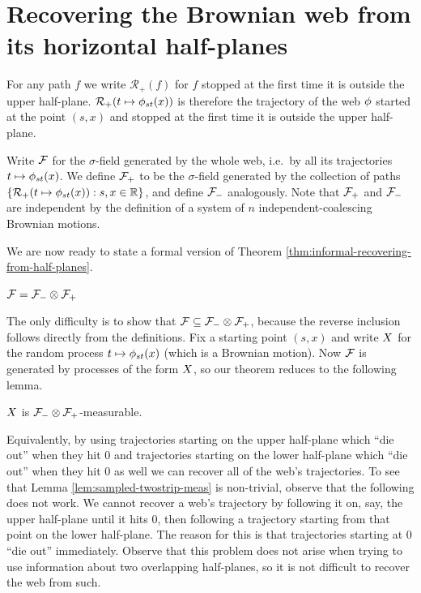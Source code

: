 \newcommand{\bmweb}{\psi}
\newcommand{\toinP}{\overset{\P}\to}
\newcommand{\statementoflemresampledetosampled}{$\resamplede \toinP \sampled$ as $\epsilon \to 0$}
{
\section{Recovering the Brownian web from its horizontal half-planes}
\label{sec:recovering-from-half-planes}


\newcommand{\restrictupper}{\mathcal{R}_{+}}

  For any path $f$ we write $\restrictupper(f)$ for $f$ stopped at the
  first time it is outside the upper half-plane.
  $\restrictupper(t \mapsto \web{s}{t}{x})$ is therefore the trajectory of the
  web $\phi$ started at the point $(s,x)$ and stopped at the first
  time it is outside the upper half-plane.

  Write $\mathcal{F}$ for the $\sigma$-field generated by the
  whole web, i.e.\ by all its trajectories $t \mapsto \phi_{{s}{t}}(x)$.
  We define $\mathcal{F}_{+}$ to be the $\sigma$-field generated by the
  collection of paths $\{\restrictupper(t \mapsto \web{s}{t}{x}) : s,x
  \in \R \}$, and define $\mathcal{F}_{-}$ analogously.
  Note that $\mathcal{F}_{+}$ and $\mathcal{F}_{-}$ are independent by the definition of
  a system of $n$ independent-coalescing Brownian motions.

  We are now ready to state a formal version of Theorem
  \ref{thm:informal-recovering-from-half-planes}.

\begin{theorem}\label{thm:recoveringfromhalfplanes}
  $\mathcal{F} = \mathcal{F}_{-} \otimes \mathcal{F}_{+}$
\end{theorem}

The only difficulty is to show that $\mathcal{F} \subseteq \mathcal{F}_{-} \otimes \mathcal{F}_{+}$,
because the reverse inclusion follows directly from the definitions.
Fix a starting point $(s,x)$ and write $X$ for the random
process $t \mapsto \phi_{{s}{t}}(x)$ (which is a Brownian motion).  Now
$\mathcal{F}$ is generated by processes of the form $X$, so
our theorem reduces to the following lemma.

\begin{lemma}
  \label{lem:sampled-twostrip-meas}
  $X$ is $\mathcal{F}_{-} \otimes \mathcal{F}_{+}$-measurable.
\end{lemma}

Equivalently, by using trajectories starting on the upper half-plane
which ``die out'' when they hit $0$ and trajectories starting on
the lower half-plane which ``die out'' when they hit $0$ as well we
can recover all of the web's trajectories.
To see that Lemma \ref{lem:sampled-twostrip-meas} is non-trivial,
observe that the following does not work. We cannot recover a web's
trajectory by following it on, say, the upper half-plane until it
hits 0, then following a trajectory starting from that point on the
lower half-plane. The reason for this is that trajectories starting at
0 ``die out'' immediately. Observe that this problem does not arise when
trying to use information about two overlapping half-planes, so it is
not difficult to recover the web from such.

}
